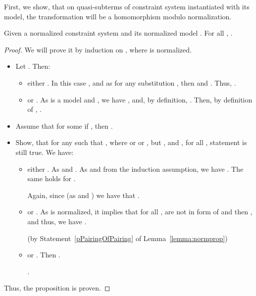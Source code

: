 First, we show, that on quasi-subterms of constraint system instantiated with its model, the transformation  will be a homomorphism modulo normalization. \begin{prop}\label{prop:subt}
Given a normalized constraint system  and its  normalized model .
For all , .
 \begin{proof}
  We will prove it by induction on , where  is normalized. 
\begin{itemize}
 \item Let . Then:
	\begin{itemize}
 		\item either .  In this case , and as  for any substitution , then   and . Thus, .

		\item or . As  is a model and , we have , and, by definition, . Then, by definition of , .
	\end{itemize}

 \item Assume that for some  if , then .
 \item Show, that for any  such that , where  
or  
 or ,
but ,  and , for all ,
 statement   is still true. 
 We have: 
	\begin{itemize}
 		\item either . As  and . As   and from the induction assumption, we have . The same holds for .

		Again, since  (as  and ) we have that 
		 \br  \br  \br  \br  \br  \br  \br  \br .


		\item or . As  is normalized, 
		it implies that for all ,  are not in form of  and then , and thus, we have . 
		 
		 (by Statement~\ref{pPairingOfPairing} of Lemma~\ref{lemma:normprop}) \br
		  \br  \br  \br  \br 


		\item or . Then .
		
		 \br .
		
	\end{itemize}
\end{itemize}

Thus, the proposition is proven.

 \end{proof}

\end{prop}












